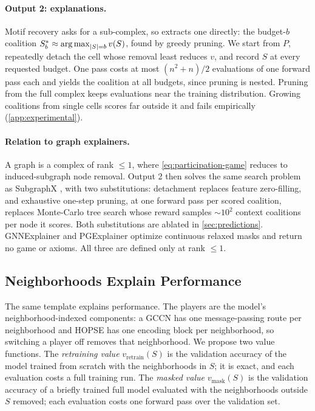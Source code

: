 \paragraph{Output 2: explanations.}
Motif recovery asks for a sub-complex, so \method extracts one
directly: the budget-$b$ coalition
$S^{*}_{b} \approx \operatorname*{arg\,max}_{|S| = b} v(S)$, found by greedy pruning.
We start from $P$, repeatedly detach the cell whose removal least
reduces $v$, and record $S$ at every requested budget. One pass costs
at most $(n^{2}+n)/2$ evaluations of one forward pass each and yields
the coalition at all budgets, since pruning is nested. Pruning from
the full complex keeps evaluations near the training distribution.
Growing coalitions from single cells scores far outside it and fails
empirically (\cref{app:experimental}).

\paragraph{Relation to graph explainers.}
A graph is a complex of rank $\le 1$, where
\cref{eq:participation-game} reduces to induced-subgraph node removal.
Output 2 then solves the same search problem as SubgraphX
\citep{yuan2021subgraphx}, with two substitutions: detachment replaces
feature zero-filling, and exhaustive one-step pruning, at one forward
pass per scored coalition, replaces Monte-Carlo tree search whose
reward samples ${\sim}10^{2}$ context coalitions per node it scores.
Both substitutions are ablated in \cref{sec:predictions}. GNNExplainer
\citep{ying2019gnnexplainer} and PGExplainer
\citep{luo2020parameterized} optimize continuous relaxed masks and
return no game or axioms. All three are defined only at rank $\le 1$.

\subsection{Neighborhoods Explain Performance}
\label{sec:framework-game2}
\label{sec:method-pipeline}

The same template explains performance. The players are the model's
neighborhood-indexed components: a GCCN has one message-passing route
per neighborhood and HOPSE has one encoding block per neighborhood, so
switching a player off removes that neighborhood. We propose two value
functions. The \emph{retraining value} $v_{\mathrm{retrain}}(S)$ is
the validation accuracy of the model trained from scratch with the
neighborhoods in $S$; it is exact, and each evaluation costs a full
training run. The \emph{masked value} $v_{\mathrm{mask}}(S)$ is the
validation accuracy of a briefly trained full model evaluated with the
neighborhoods outside $S$ removed; each evaluation costs one forward
pass over the validation set.

